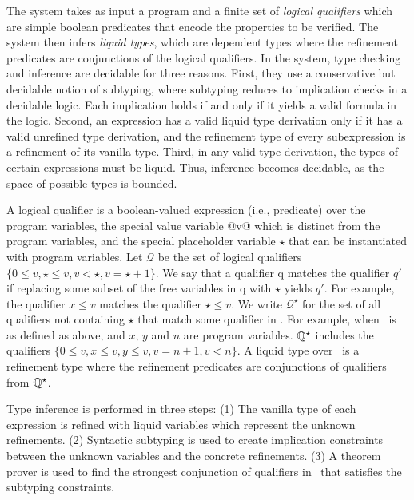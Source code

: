 The system takes as input a program and 
a finite set of \textit{logical qualifiers}
which are simple boolean predicates 
that encode the properties to be verified. 
The system then infers
\textit{liquid types}, which are dependent types where the refinement predicates are conjunctions of the logical qualifiers.
In the system, type checking and inference are decidable for
three reasons. 
%
First, they use a conservative but decidable
notion of subtyping, where 
subtyping reduces to implication checks in a decidable logic.
Each implication holds if and only if it yields a valid formula in
the logic. 
%
Second, an expression has a valid liquid type derivation
only if it has a valid unrefined type derivation, and the refinement 
type of every subexpression is a refinement of its vanilla type. 
%
Third, in any valid type derivation, the types of certain expressions
must be liquid. Thus, inference becomes decidable, as the space of
possible types is bounded. 


A logical qualifier is a
boolean-valued expression (i.e., predicate) over the program variables, 
the special value variable @v@ which is distinct from the
program variables, and the special placeholder variable $\star$ that
can be instantiated with program variables. 
Let $\mathcal{Q}$ be the set of logical qualifiers
$\{0 \leq v, \star \leq v, v < \star,  v = \star + 1\}$. 
%
We say that
a qualifier q matches the qualifier $q'$
if replacing some subset of
the free variables in q with $\star$ yields $q'$.
For example, the qualifier
$x \leq v$ matches the qualifier $\star \leq v$. 
We write $\mathcal{Q}^\star$
for the set of all
qualifiers not containing $\star$ that match some qualifier in \qset. 
For example, when \qset\ is as defined as above, 
and $x$, $y$ and $n$ are program variables.
$\mathbb{Q}^\star$
includes the qualifiers
$\{0 \leq v, x \leq v, y \leq v, v = n + 1, v <n\}$. 
A liquid type over \qset\ is a refinement type where the refinement predicates are
conjunctions of qualifiers from $\mathbb{Q} ^ \star$.

Type inference is performed in three steps:
(1) The vanilla type of each expression is refined with liquid variables
which represent the unknown refinements.
(2) Syntactic subtyping is used to create implication constraints 
between the unknown variables and the concrete refinements.
(3) A theorem prover is used to find the strongest conjunction
of qualifiers in \qset\
that satisfies the subtyping constraints.   

